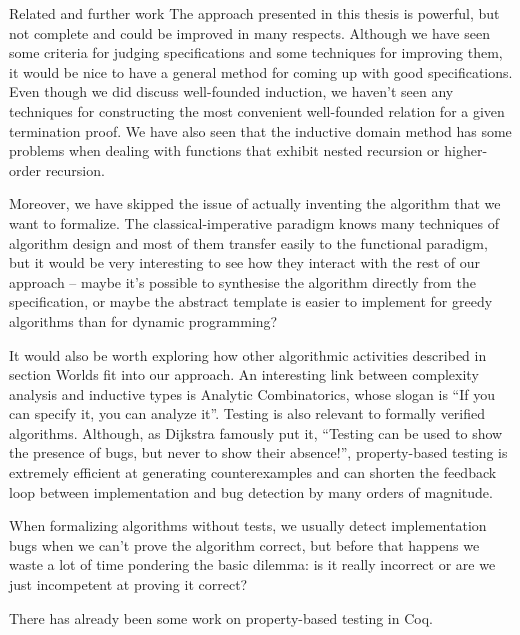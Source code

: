 \documentclass{beamer}
\begin{document}
\begin{frame}{Related and further work}
	The approach presented in this thesis is powerful, but not complete and could be improved in many respects. Although we have seen some criteria for judging specifications and some techniques for improving them, it would be nice to have a general method for coming up with good specifications. Even though we did discuss well-founded induction, we haven't seen any techniques for constructing the most convenient well-founded relation for a given termination proof. We have also seen that the inductive domain method has some problems when dealing with functions that exhibit nested recursion or higher-order recursion.

	Moreover, we have skipped the issue of actually inventing the algorithm that we want to formalize. The classical-imperative paradigm knows many techniques of algorithm design and most of them transfer easily to the functional paradigm, but it would be very interesting to see how they interact with the rest of our approach -- maybe it's possible to synthesise the algorithm directly from the specification, or maybe the abstract template is easier to implement for greedy algorithms than for dynamic programming?
	
	It would also be worth exploring how other algorithmic activities described in section Worlds fit into our approach. An interesting link between complexity analysis and inductive types is Analytic Combinatorics, whose slogan is ``If you can specify it, you can analyze it''. Testing is also relevant to formally verified algorithms. Although, as Dijkstra famously put it, ``Testing can be used to show the presence of bugs, but never to show their absence!'', property-based testing is extremely efficient at generating counterexamples and can shorten the feedback loop between implementation and bug detection by many orders of magnitude.
	
	When formalizing algorithms without tests, we usually detect implementation bugs when we can't prove the algorithm correct, but before that happens we waste a lot of time pondering the basic dilemma: is it really incorrect or are we just incompetent at proving it correct?
	
	There has already been some work on property-based testing in Coq.
\end{frame}
\end{document}
